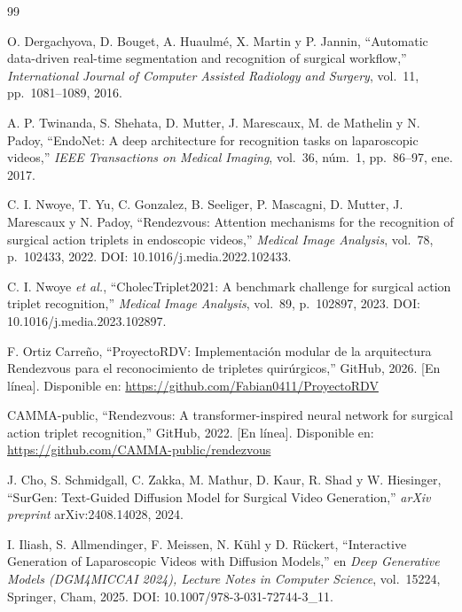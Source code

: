\documentclass[11pt]{article}
\begin{document}
\begin{thebibliography}{99}

O. Dergachyova, D. Bouget, A. Huaulmé, X. Martin y P. Jannin, ``Automatic data-driven real-time segmentation and recognition of surgical workflow,'' \emph{International Journal of Computer Assisted Radiology and Surgery}, vol.~11, pp.~1081--1089, 2016.

A. P. Twinanda, S. Shehata, D. Mutter, J. Marescaux, M. de Mathelin y N. Padoy, ``EndoNet: A deep architecture for recognition tasks on laparoscopic videos,'' \emph{IEEE Transactions on Medical Imaging}, vol.~36, núm.~1, pp.~86--97, ene. 2017.

C. I. Nwoye, T. Yu, C. Gonzalez, B. Seeliger, P. Mascagni, D. Mutter, J. Marescaux y N. Padoy, ``Rendezvous: Attention mechanisms for the recognition of surgical action triplets in endoscopic videos,'' \emph{Medical Image Analysis}, vol.~78, p.~102433, 2022. DOI: 10.1016/j.media.2022.102433.

C. I. Nwoye \emph{et al.}, ``CholecTriplet2021: A benchmark challenge for surgical action triplet recognition,'' \emph{Medical Image Analysis}, vol.~89, p.~102897, 2023. DOI: 10.1016/j.media.2023.102897.

F. Ortiz Carreño, ``ProyectoRDV: Implementación modular de la arquitectura Rendezvous para el reconocimiento de tripletes quirúrgicos,'' GitHub, 2026. [En línea]. Disponible en: \url{https://github.com/Fabian0411/ProyectoRDV}

CAMMA-public, ``Rendezvous: A transformer-inspired neural network for surgical action triplet recognition,'' GitHub, 2022. [En línea]. Disponible en: \url{https://github.com/CAMMA-public/rendezvous}

J. Cho, S. Schmidgall, C. Zakka, M. Mathur, D. Kaur, R. Shad y W. Hiesinger, ``SurGen: Text-Guided Diffusion Model for Surgical Video Generation,'' \emph{arXiv preprint} arXiv:2408.14028, 2024.

I. Iliash, S. Allmendinger, F. Meissen, N. Kühl y D. Rückert, ``Interactive Generation of Laparoscopic Videos with Diffusion Models,'' en \emph{Deep Generative Models (DGM4MICCAI 2024), Lecture Notes in Computer Science}, vol.~15224, Springer, Cham, 2025. DOI: 10.1007/978-3-031-72744-3\_11.

\end{thebibliography}
\end{document}
